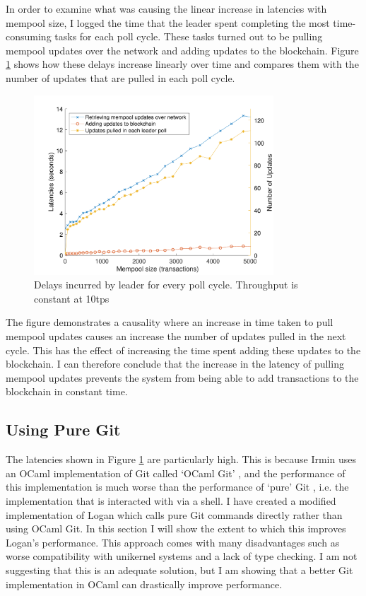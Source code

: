 \documentclass[12pt,a4paper,twoside,openright]{report}
\begin{document}
	In order to examine what was causing the linear increase in latencies with mempool size, I logged the time that the leader spent completing the most time-consuming tasks for each poll cycle.
	These tasks turned out to be pulling mempool updates over the network and adding updates to the blockchain.
	Figure \ref{figs:leaderdelays} shows how these delays increase linearly over time and compares them with the number of updates that are pulled in each poll cycle.
	\begin{figure}
		\centering
		\includegraphics[width=0.8\textwidth]{figs/leader_delays_num_pulled.pdf}
		\caption{Delays incurred by leader for every poll cycle. Throughput is constant at 10tps}
		\label{figs:leaderdelays}
	\end{figure}
	The figure demonstrates a causality where an increase in time taken to pull mempool updates causes an increase the number of updates pulled in the next cycle. 
	This has the effect of increasing the time spent adding these updates to the blockchain.
	I can therefore conclude that the increase in the latency of pulling mempool updates prevents the system from being able to add transactions to the blockchain in constant time. \\

	\subsection{Using Pure Git}
	The latencies shown in Figure \ref{figs:leaderdelays} are particularly high. 
	This is because Irmin uses an OCaml implementation of Git called `OCaml Git' \parencite{OcamlGit}, and the performance of this implementation is much worse than the performance of `pure' Git \parencite{Git}, i.e. the implementation that is interacted with via a shell.
	I have created a modified implementation of Logan which calls pure Git commands directly rather than using OCaml Git.
	In this section I will show the extent to which this improves Logan's performance.
	This approach comes with many disadvantages such as worse compatibility with unikernel systems and a lack of type checking.
	I am not suggesting that this is an adequate solution, but I am showing that a better Git implementation in OCaml can drastically improve performance.\\ 
\end{document}
